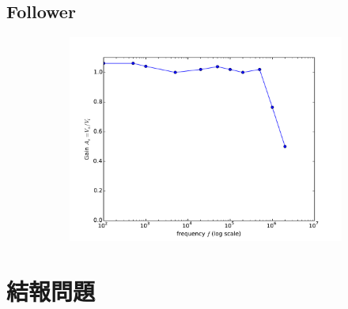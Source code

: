 \documentclass[12pt, a4paper]{article}
\begin{document}
\subsection{Follower}
\begin{figure}[H]
  \centering
  \begin{subfigure}[b]{0.45\textwidth}
    \includegraphics[width=1\textwidth]{img/q5.pdf}
  \end{subfigure}
\end{figure}



\section{結報問題}
\end{document}
